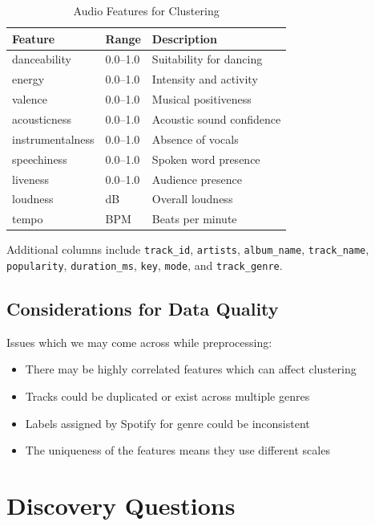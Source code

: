 \documentclass[10pt,twocolumn]{article}
\begin{document}
\begin{table}[htbp]
\caption{Audio Features for Clustering}
\label{tab:features}
\centering
\footnotesize
\begin{tabular}{@{}lll@{}}
\toprule
\textbf{Feature} & \textbf{Range} & \textbf{Description} \\
\midrule
danceability & 0.0--1.0 & Suitability for dancing \\
energy & 0.0--1.0 & Intensity and activity \\
valence & 0.0--1.0 & Musical positiveness \\
acousticness & 0.0--1.0 & Acoustic sound confidence \\
instrumentalness & 0.0--1.0 & Absence of vocals \\
speechiness & 0.0--1.0 & Spoken word presence \\
liveness & 0.0--1.0 & Audience presence \\
loudness & dB & Overall loudness \\
tempo & BPM & Beats per minute \\
\bottomrule
\end{tabular}
\end{table}

Additional columns include \texttt{track\_id}, \texttt{artists}, \texttt{album\_name}, \texttt{track\_name}, \texttt{popularity}, \texttt{duration\_ms}, \texttt{key}, \texttt{mode}, and \texttt{track\_genre}.

\subsection{Considerations for Data Quality}
Issues which we may come across while preprocessing:
\begin{itemize}
    \item There may be highly correlated features which can affect clustering 
    \item Tracks could be duplicated or exist across multiple genres 
    \item Labels assigned by Spotify for genre could be inconsistent
    \item The uniqueness of the features means they use different scales
\end{itemize}

\section{Discovery Questions}
\end{document}
